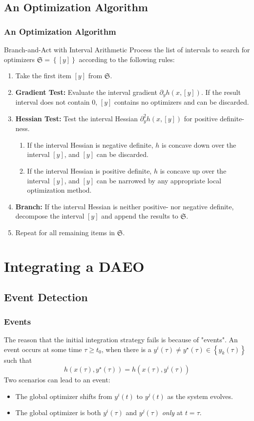 \documentclass[10pt]{beamer}
\newcommand{\frS}{\ensuremath{\mathfrak{S}}}
\begin{document}
\subsection{An Optimization Algorithm}
\begin{frame}
	\frametitle{An Optimization Algorithm}
	\begin{block}{Branch-and-Act with Interval Arithmetic}
		Process the list of intervals to search for optimizers $\frS = \left\{[y]\right\}$ according to the following rules:
		\begin{enumerate} 
			\item Take the first item $[y]$ from $\frS$.
			\item \textbf{Gradient Test:} Evaluate the interval gradient $\partial_y h(x, [y])$. If the result interval does not contain $0$, $[y]$ contains no optimizers and can be discarded.
			\item \textbf{Hessian Test:} Test the interval Hessian $\partial^2_y h(x, [y])$ for positive definite-ness.
			\begin{enumerate}
				\item If the interval Hessian is negative definite, $h$ is concave down over the interval $[y]$, and $[y]$ can be discarded.
				\item If the interval Hessian is positive definite, $h$ is concave up over the interval $[y]$, and $[y]$ can be narrowed by any appropriate local optimization method.
			\end{enumerate}
			\item \textbf{Branch:} If the interval Hessian is neither positive- nor negative definite, decompose the interval $[y]$ and append the results to $\frS$.
			\item Repeat for all remaining items in $\frS$.
		\end{enumerate}
	\end{block}
\end{frame}
\section{Integrating a DAEO}
\subsection{Event Detection}
\begin{frame}
	\frametitle{Events}
	The reason that the initial integration strategy fails is because of "events".
	\vfill
	An event occurs at some time $\tau \geq t_0$, when there is a $y^i(\tau)\neq y^\star(\tau)\in\left\{y_k(\tau)\right\}$ such that
	\begin{equation}
		h(x(\tau), y^\star(\tau)) = h(x(\tau), y^i(\tau))
	\end{equation}
	Two scenarios can lead to an event:
	\begin{itemize}
		\item The global optimizer shifts from $y^i(t)$ to $y^j(t)$ as the system evolves.
		\item The global optimizer is both $y^i(\tau)$ and $y^j(\tau)$ \textit{only} at $t=\tau$.
	\end{itemize}
	\vfill
\end{frame}
\end{document}
